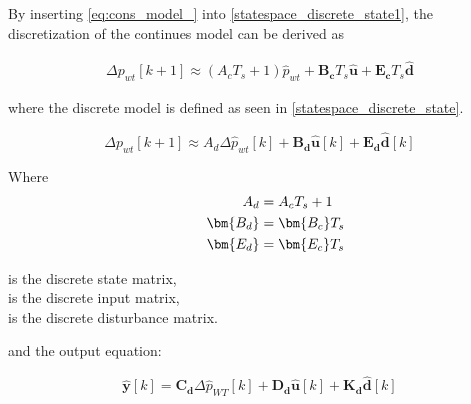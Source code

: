 By inserting \eqref{eq:cons_model_} into \eqref{statespace_discrete_state1}, the discretization of the continues model can be derived as

\begin{equation}
  \begin{split}
  \Delta p_{wt}[k+1] \approx (A_cT_s+1)\hat{p}_{wt}+\bm{B_c}T_s \bm{\hat{u}}+\bm{E_c} T_s \bm{\hat{d}}
  \end{split}
  \label{eq:dist_statespace_forward_euler}
\end{equation}

where the discrete model is defined as seen in \eqref{statespace_discrete_state}.

\begin{equation}
\Delta p_{wt}[k+1] \approx A_d \Delta \hat{p}_{wt}[k]  + \bm{B_d} \bm{\hat{u}}[k] + \bm{E_d} \bm{\hat{d}}[k] 
 \label{statespace_discrete_state}
\end{equation}

\begin{minipage}[t]{0.2\textwidth}
Where\vspace{-3mm}
\hspace*{8mm}\begin{equation*}
\begin{split}
 \hspace*{8mm} A_d &= A_cT_s+1  \\
 \hspace*{8mm} \bm{B_d} &= \bm{B_c}T_s\\
 \hspace*{8mm} \bm{E_d} &= \bm{E_c}T_s
 \end{split}
 \end{equation*}
\end{minipage}
\begin{minipage}[t]{0.78\textwidth}
\vspace{2mm}\hspace*{8mm}is the discrete state matrix, \\
\vspace{2mm}\hspace*{8mm}is the discrete input matrix, \\
\hspace*{8mm}is the discrete disturbance matrix. \\ 
\end{minipage}

and the output equation:

\begin{equation}
  \bm{\hat{y}}[k] = \bm{C_d} \Delta \hat{p}_{WT}[k] + \bm{D_d} \bm{\hat{u}}[k] + \bm{K_d} \bm{\hat{d}}[k]
\label{statespace_control_output_discrete}
\end{equation}

